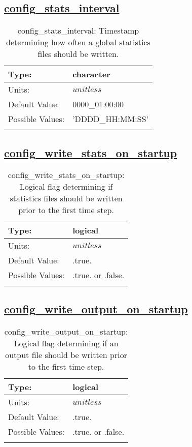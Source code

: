 \subsection[config\_stats\_interval]{\hyperref[sec:nm_tab_io]{config\_stats\_interval}}
\label{subsec:nm_sec_config_stats_interval}
\begin{center}
\begin{longtable}{| p{2.0in} | p{4.0in} |}
    \hline
    Type: & character \\
    \hline
    Units: & $unitless$ \\
    \hline
    Default Value: & 0000\_01:00:00 \\
    \hline
    Possible Values: & 'DDDD\_HH:MM:SS' \\
    \hline
    \caption{config\_stats\_interval: Timestamp determining how often a global statistics files should be written.}
\end{longtable}
\end{center}
\subsection[config\_write\_stats\_on\_startup]{\hyperref[sec:nm_tab_io]{config\_write\_stats\_on\_startup}}
\label{subsec:nm_sec_config_write_stats_on_startup}
\begin{center}
\begin{longtable}{| p{2.0in} | p{4.0in} |}
    \hline
    Type: & logical \\
    \hline
    Units: & $unitless$ \\
    \hline
    Default Value: & .true. \\
    \hline
    Possible Values: & .true. or .false. \\
    \hline
    \caption{config\_write\_stats\_on\_startup: Logical flag determining if statistics files should be written prior to the first time step.}
\end{longtable}
\end{center}
\subsection[config\_write\_output\_on\_startup]{\hyperref[sec:nm_tab_io]{config\_write\_output\_on\_startup}}
\label{subsec:nm_sec_config_write_output_on_startup}
\begin{center}
\begin{longtable}{| p{2.0in} | p{4.0in} |}
    \hline
    Type: & logical \\
    \hline
    Units: & $unitless$ \\
    \hline
    Default Value: & .true. \\
    \hline
    Possible Values: & .true. or .false. \\
    \hline
    \caption{config\_write\_output\_on\_startup: Logical flag determining if an output file should be written prior to the first time step.}
\end{longtable}
\end{center}
